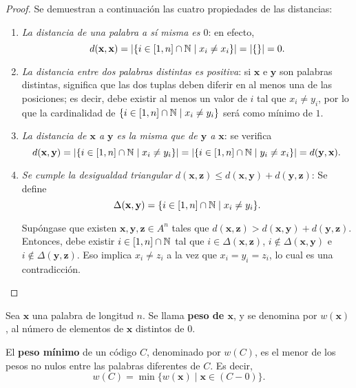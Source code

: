 \begin{proof}
	Se demuestran a continuación las cuatro propiedades de las distancias:
	\begin{enumerate}
		\item \textit{La distancia de una palabra a sí misma es $0$}: en efecto,
		\[d(\textbf{x}, \textbf{x}) = |\{i\in[1,n]\cap\mathbb{N} \mid x_i \neq x_i\}| = |\{\}| = 0.\]
		\item \textit{La distancia entre dos palabras distintas es positiva}: si $\textbf{x}$ e $\textbf{y}$ son palabras distintas, significa que las dos tuplas deben diferir en al menos una de las posiciones; es decir, debe existir al menos un valor de $i$ tal que $x_i \neq y_i$, por lo que la cardinalidad de $\{i \in [1, n]\cap\mathbb{N} \mid x_i \neq y_i\}$ será como mínimo de $1$.
		\item \textit{La distancia de $\textbf{x}$ a $\textbf{y}$ es la misma que de $\textbf{y}$ a $\textbf{x}$}: se verifica
		\[d(\textbf{x}, \textbf{y}) = |\{i\in[1,n]\cap\mathbb{N} \mid x_i \neq y_i\}| = |\{i\in[1,n]\cap\mathbb{N} \mid y_i \neq x_i\}| = d(\textbf{y}, \textbf{x}).\]
		\item \textit{Se cumple la desigualdad triangular $d(\textbf{x}, \textbf{z}) \leq d(\textbf{x}, \textbf{y}) + d(\textbf{y}, \textbf{z})$}:
		Se define
		\[\Delta(\textbf{x}, \textbf{y}) = \{i\in[1,n]\cap\mathbb{N} \mid x_i \neq y_i\}.\]
		
		Supóngase que existen $\textbf{x}, \textbf{y}, \textbf{z} \in A^n$ tales que $d(\textbf{x}, \textbf{z}) > d(\textbf{x}, \textbf{y}) + d(\textbf{y}, \textbf{z})$. Entonces, debe existir $i \in [1, n]\cap\mathbb{N}$ tal que $i \in \Delta(\textbf{x}, \textbf{z})$, $i \notin \Delta(\textbf{x}, \textbf{y})$ e $i \notin \Delta(\textbf{y}, \textbf{z})$. Eso implica $x_i \neq z_i$ a la vez que $x_i = y_i = z_i$, lo cual es una contradicción.
	\end{enumerate}
\end{proof}

\begin{definition}
	Sea $\textbf{x}$ una palabra de longitud $n$. Se llama \textbf{peso de $\textbf{x}$}, y se denomina por $w(\textbf{x})$, al número de elementos de $\textbf{x}$ distintos de $0$.
\end{definition}

\begin{definition}
	El \textbf{peso mínimo} de un código $C$, denominado por $w(C)$, es el menor de los pesos no nulos entre las palabras diferentes de $C$. Es decir,
	\[w(C) = \min\{w(\textbf{x}) \mid \textbf{x}\in (C - 0)\}.\]
\end{definition}

